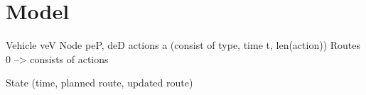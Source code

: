 \chapter{Model}

Vehicle veV
Node peP, deD 
actions a (consist of type, time t, len(action))
Routes 0 --> consists of actions

State (time, planned route, updated route) 